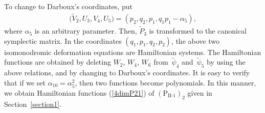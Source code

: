 \documentclass[pdftex]{sigma}
\numberwithin{equation}{section}
\begin{document}
To change to Darboux's coordinates, put
\begin{gather*}
\big(\widetilde{V}_2, U_3, V_4, U_5\big) = (p_2, q_2, p_1, q_1p_1 - \alpha _5),
\end{gather*}
where $\alpha _5$ is an arbitrary parameter. Then, $\widetilde{P}_3$ is transformed to the canonical symplectic mat\-rix. In the coordinates $(q_1, p_1, q_2, p_2)$, the above two isomonodromic deformation equations are Hamiltonian systems. The Hamiltonian functions are obtained by deleting $W_2$, $W_4$, $W_6$ from~$\widetilde{\psi}_4$ and~$\widetilde{\psi}_5$ by using the above relations, and by changing to Darboux's coordinates. It is easy to verify that if we set $\alpha _{10}=\alpha _5^2$, then two functions become polynomials. In this manner, we obtain Hamiltonian functions (\ref{4dimP21}) of $(\text{P}_\text{II-1})_2$ given in Section~\ref{section1}.
\end{document}
